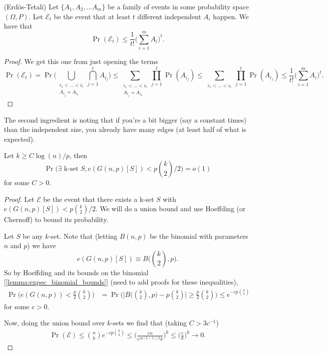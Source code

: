 \begin{lemma}
	\label{lemma:erdos_tetali}
	(Erdös-Tetali) Let $\{A_1, A_2, \dots A_m\}$ be a family of events
	in some probability space $(\Omega, P)$. Let
	$\mathcal{E}_t$ be the event that at least $t$ different
	independent $A_i$ happen. We have that
	\[
		\Pr(\mathcal{E}_t) \leq \frac{1}{t!}\bigg(\sum_{i=1}^{m} A_i\bigg)^t.
	\]
\end{lemma}
\begin{proof}
	We get this one from just opening the terms
	\[
		\Pr(\mathcal{E}_t) = \Pr\bigg(\bigcup_{\substack{i_1 < \dots <
		i_t\\ A_{i_j} \not\sim A_{i_k}}} \bigcap_{j = 1}^{t} A_{i_j}\bigg)
		\leq \sum_{\substack{i_1 < \dots < i_t\\ A_{i_j} \not\sim
		A_{i_k}}} \prod_{j = 1}^t \Pr(A_{i_j}) \leq \sum_{\substack{i_1
		< \dots < i_t}} \prod_{j = 1}^t \Pr(A_{i_j}) \leq
		\frac{1}{t!}\bigg(\sum_{i=1}^{m} A_i\bigg)^t.
	\]
\end{proof}

The second ingredient is noting that if you're a bit bigger (say a
constant times) than the independent size, you already have many
edges (at least half of what is expected).

\begin{lemma}
	\label{lemma:concentration_edges}
	Let $k \geq C\log(n)/p$, then
	\[
		\Pr\bigg(\exists \text{ k-set } S, e(G(n,p)[S]) <
		p\binom{k}{2}/2\bigg) = o(1)
	\]
	for some $C > 0$.
\end{lemma}
\begin{proof}
	Let $\mathcal{E}$ be the event that there exists a k-set $S$ with
	$e(G(n,p)[S]) < p\binom{k}{2}/2$.
	We will do a union bound and use Hoeffding (or Chernoff) to bound
	its probability.

	Let $S$ be any $k$-set. Note that (letting $B(n,p)$ be the binomial
	with parameters $n$ and $p$) we have
	\[e(G(n,p)[S]) \equiv B\bigg(\binom{k}{2},p\bigg). \]
	So by Hoeffding and its bounds on the binomial
	[\ref{lemma:expec_binomial_bounds}] (need to add
	proofs for these inequalities),
	\begin{align*}
		\Pr\bigg(e(G(n,p)) < \frac{p}{2}\binom{k}{2}\bigg) &=
		\Pr\bigg(\bigg|B\bigg(\binom{k}{2}, p\bigg) - p\binom{k}{2}\bigg|
		\geq \frac{p}{2}\binom{k}{2}\bigg)
		\leq e^{-c p\binom{k}{2}}
	\end{align*}
	for some $c > 0$.

	Now, doing the union bound over $k$-sets we find that (taking $C > 3c^{-1}$)
	\begin{align*}
		\Pr(\mathcal{E}) \leq \binom{n}{k}e^{-c p\binom{k}{2}} \leq
		\bigg(\frac{en}{e^{cp(k-1)/2}k}\bigg)^k \leq
		\bigg(\frac{e}{k}\bigg)^k \to 0.
	\end{align*}
\end{proof}


